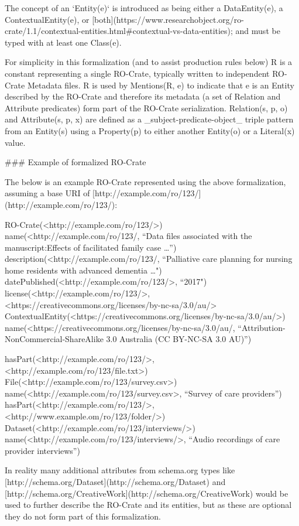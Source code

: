 The concept of an `Entity(e)` is introduced as being either a DataEntity(e), a ContextualEntity(e), or [both](https://www.researchobject.org/ro-crate/1.1/contextual-entities.html#contextual-vs-data-entities); and must be typed with at least one Class(e). 

For simplicity in this formalization (and to assist production rules below) R is a constant representing a single RO-Crate, typically written to independent RO-Crate Metadata files. R is used by Mentions(R, e) to indicate that e is an Entity described by the RO-Crate and therefore its metadata (a set of Relation and Attribute predicates) form part of the RO-Crate serialization. Relation(s, p, o) and Attribute(s, p, x) are defined as a _subject-predicate-object_ triple pattern from an Entity(s) using a Property(p) to either another Entity(o) or a Literal(x) value.


### Example of formalized RO-Crate 

The below is an example RO-Crate represented using the above formalization, assuming a base URI of [http://example.com/ro/123/](http://example.com/ro/123/):

    RO-Crate(<http://example.com/ro/123/>)
    name(<http://example.com/ro/123/, 
        “Data files associated with the manuscript:Effects of facilitated family case …”)
    description(<http://example.com/ro/123/, 
        “Palliative care planning for nursing home residents with advanced dementia …")
    datePublished(<http://example.com/ro/123/>, “2017")
    license(<http://example.com/ro/123/>, <https://creativecommons.org/licenses/by-nc-sa/3.0/au/>
    ContextualEntity(<https://creativecommons.org/licenses/by-nc-sa/3.0/au/>)
    name(<https://creativecommons.org/licenses/by-nc-sa/3.0/au/, 
        “Attribution-NonCommercial-ShareAlike 3.0 Australia (CC BY-NC-SA 3.0 AU)”)

    hasPart(<http://example.com/ro/123/>, <http://example.com/ro/123/file.txt>)
    File(<http://example.com/ro/123/survey.csv>)
    name(<http://example.com/ro/123/survey.csv>, “Survey of care providers”)
    hasPart(<http://example.com/ro/123/>, <http://www.example.om/ro/123/folder/>)
    Dataset(<http://example.com/ro/123/interviews/>)
    name(<http://example.com/ro/123/interviews/>, “Audio recordings of care provider interviews”)

In reality many additional attributes from schema.org types like [http://schema.org/Dataset](http://schema.org/Dataset) and [http://schema.org/CreativeWork](http://schema.org/CreativeWork)  would be used to further describe the RO-Crate and its entities, but as these are optional they do not form part of this formalization.


